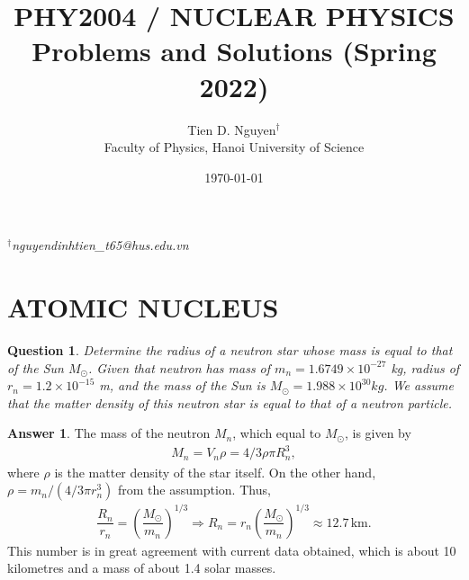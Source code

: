 \documentclass[12pt]{paper}
\title{PHY2004 / NUCLEAR PHYSICS\\
Problems and Solutions (Spring 2022)}
\author{Tien D. Nguyen$^\dagger$\\
Faculty of Physics, Hanoi University of Science}
\date{\today}
\numberwithin{equation}{section}
\newtheorem{question}{Question}
\theoremstyle{definition}
\newtheorem*{answer}{Answer}
\numberwithin{equation}{section}
\begin{document}
\maketitle
\vfill
$^\dagger$\textit{nguyendinhtien\_t65@hus.edu.vn}
\newpage

\section{ATOMIC NUCLEUS}
\begin{question}
    Determine the radius of a neutron star whose mass is equal to that of the Sun $M_\odot$. Given that neutron has mass of $m_n=1.6749\times 10^{-27}$ kg, radius of $r_n=1.2\times 10^{-15}$ m, and the mass of the Sun is $M_\odot=1.988\times 10^{30}kg$. We assume that the matter density of this neutron star is equal to that of a neutron particle.
\end{question}
\begin{answer}
    The mass of the neutron $M_n$, which equal to $M_\odot$, is given by
    \begin{align} 
        M_n = V_n\rho = 4/3\rho\pi R_n^3,
    \end{align}
    where $\rho$ is the matter density of the star itself. On the other hand, $\rho = m_n/(4/3\pi r_n^3)$ from the assumption. Thus, 
    \begin{align}
        \dfrac{R_n}{r_n} = \left(\dfrac{M_\odot}{m_n}\right)^{1/3}\Rightarrow R_n = r_n\left(\dfrac{M_\odot}{m_n}\right)^{1/3}\approx 12.7\,\text{km}.
    \end{align}
    This number is in great agreement with current data obtained, which is about 10 kilometres and a mass of about 1.4 solar masses.
\end{answer}
\end{document}
